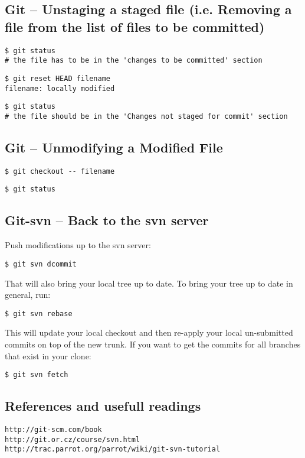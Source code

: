 \documentclass[11pt,twoside]{article}
\begin{document}
\subsection*{Git -- Unstaging a staged file (i.e. Removing a file from the list of files to be 
committed)}

\begin{verbatim}
$ git status 
# the file has to be in the 'changes to be committed' section
\end{verbatim}

\begin{verbatim}
$ git reset HEAD filename
filename: locally modified
\end{verbatim}
\begin{verbatim}
$ git status  
# the file should be in the 'Changes not staged for commit' section
\end{verbatim}

\subsection*{Git -- Unmodifying a Modified File}

\begin{verbatim}
$ git checkout -- filename
\end{verbatim}
\begin{verbatim}
$ git status
\end{verbatim}

\subsection*{Git-svn -- Back to the svn server}

Push modifications up to the svn server:
\begin{verbatim}
$ git svn dcommit
\end{verbatim}
That will also bring your local tree up to date. To bring your tree up to date in general, run: 
\begin{verbatim}
$ git svn rebase
\end{verbatim}
This will update your local checkout and then re-apply your local un-submitted commits on top of the new trunk. 
If you want to get the commits for all branches that exist in your clone: 
\begin{verbatim}
$ git svn fetch
\end{verbatim}

\subsection*{References and usefull readings}

\verb|http://git-scm.com/book|
\\
\verb|http://git.or.cz/course/svn.html|
\\
\verb|http://trac.parrot.org/parrot/wiki/git-svn-tutorial|
\end{document}
